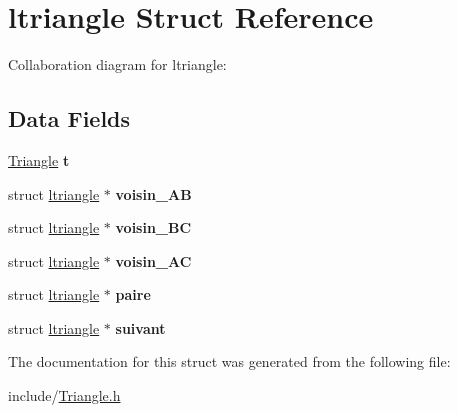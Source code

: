 \hypertarget{structltriangle}{\section{ltriangle Struct Reference}
\label{structltriangle}
}


Collaboration diagram for ltriangle\+:
\subsection*{Data Fields}
\begin{DoxyCompactItemize}
\item 
\hypertarget{structltriangle_a5220ca772b1778064a919159ee4610bc}{\hyperlink{struct_triangle}{Triangle} {\bfseries t}}\label{structltriangle_a5220ca772b1778064a919159ee4610bc}

\item 
\hypertarget{structltriangle_a9d26fd01a778641a6ccd906858a1ad70}{struct \hyperlink{structltriangle}{ltriangle} $\ast$ {\bfseries voisin\+\_\+\+A\+B}}\label{structltriangle_a9d26fd01a778641a6ccd906858a1ad70}

\item 
\hypertarget{structltriangle_a01bb0c9ed03dee683f872d5fe173d836}{struct \hyperlink{structltriangle}{ltriangle} $\ast$ {\bfseries voisin\+\_\+\+B\+C}}\label{structltriangle_a01bb0c9ed03dee683f872d5fe173d836}

\item 
\hypertarget{structltriangle_aa398d5e2871176ec97c29c0ce9119c85}{struct \hyperlink{structltriangle}{ltriangle} $\ast$ {\bfseries voisin\+\_\+\+A\+C}}\label{structltriangle_aa398d5e2871176ec97c29c0ce9119c85}

\item 
\hypertarget{structltriangle_a89dd9d22f5ab27cef11e2f466c5b1ee9}{struct \hyperlink{structltriangle}{ltriangle} $\ast$ {\bfseries paire}}\label{structltriangle_a89dd9d22f5ab27cef11e2f466c5b1ee9}

\item 
\hypertarget{structltriangle_a7aff38048a9cdf8aec28a1f8db9adaf8}{struct \hyperlink{structltriangle}{ltriangle} $\ast$ {\bfseries suivant}}\label{structltriangle_a7aff38048a9cdf8aec28a1f8db9adaf8}

\end{DoxyCompactItemize}


The documentation for this struct was generated from the following file\+:\begin{DoxyCompactItemize}
\item 
include/\hyperlink{_triangle_8h}{Triangle.\+h}\end{DoxyCompactItemize}

